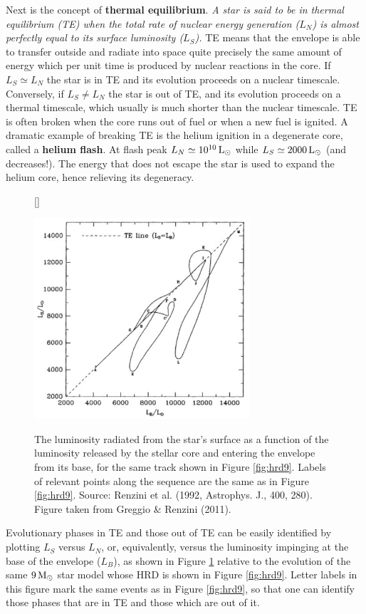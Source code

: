 \documentclass[a4paper,10pt]{article}
\begin{document}
{\noindent}Next is the concept of \textbf{thermal equilibrium}. \textit{A star is said to be in thermal equilibrium (TE) when the total rate of nuclear energy generation ($L_N$) is almost perfectly equal to its surface luminosity ($L_S$).} TE means that the envelope is able to transfer outside and radiate into space quite precisely the same amount of energy which per unit time is produced by nuclear reactions in the core. If $L_S\simeq L_N$ the star is in TE and its evolution proceeds on a nuclear timescale. Conversely, if $L_S\neq L_N$ the star is out of TE, and its evolution proceeds on a thermal timescale, which usually is much shorter than the nuclear timescale. TE is often broken when the core runs out of fuel or when a new fuel is ignited. A dramatic example of breaking TE is the helium ignition in a degenerate core, called a \textbf{helium flash}. At flash peak $L_N\simeq 10^{10}\,{\rm L_\odot}$ while $L_S\simeq2000\,{\rm L_\odot}$ (and decreases!). The energy that does not escape the star is used to expand the helium core, hence relieving its degeneracy.

\begin{figure}[h]
    [\FBwidth]
    {\caption{\footnotesize{The luminosity radiated from the star's surface as a function of the luminosity released by the stellar core and entering the envelope from its base, for the same track shown in Figure \ref{fig:hrd9}. Labels of relevant points along the sequence are the same as in Figure \ref{fig:hrd9}. Source: Renzini et al. (1992, Astrophys. J., 400, 280). Figure taken from Greggio \& Renzini (2011).}}
    \label{fig:lslb9}}
    {\includegraphics[width=8cm]{figures/LSLB_9M.png}}
\end{figure}

{\noindent}Evolutionary phases in TE and those out of TE can be easily identified by plotting $L_S$ versus $L_N$, or, equivalently, versus the luminosity impinging at the base of the envelope ($L_B$), as shown in Figure \ref{fig:lslb9} relative to the evolution of the same $9\,{\rm M_\odot}$ star model whose HRD is shown in Figure \ref{fig:hrd9}. Letter labels in this figure mark the same events as in Figure \ref{fig:hrd9}, so that one can identify those phases that are in TE and those which are out of it.
\end{document}
